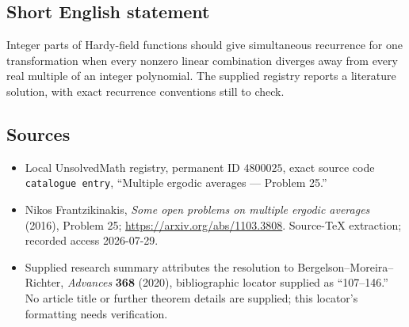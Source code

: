 \documentclass[11pt]{article}
\begin{document}
\subsection{Short English statement}
Integer parts of Hardy-field functions should give simultaneous recurrence for one transformation when every nonzero linear combination diverges away from every real multiple of an integer polynomial. The supplied registry reports a literature solution, with exact recurrence conventions still to check.
\subsection{Sources}
\begin{itemize}
\item Local UnsolvedMath registry, permanent ID \(4800025\), exact source code \texttt{catalogue entry}, ``Multiple ergodic averages --- Problem 25.''
\item Nikos Frantzikinakis, \emph{Some open problems on multiple ergodic averages} (2016), Problem 25; \url{https://arxiv.org/abs/1103.3808}. Source-TeX extraction; recorded access 2026-07-29.
\item Supplied research summary attributes the resolution to Bergelson--Moreira--Richter, \emph{Advances} \textbf{368} (2020), bibliographic locator supplied as ``107--146.'' No article title or further theorem details are supplied; this locator's formatting needs verification.
\end{itemize}
\end{document}
